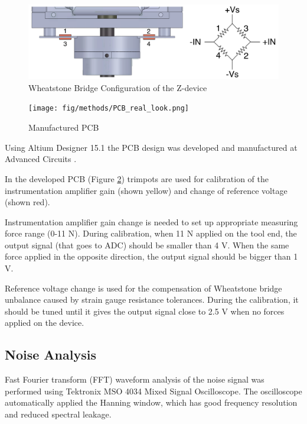 \begin{figure}[h]
	\begin{center}
		\includegraphics[width=140mm]{fig/methods/Wiring_z.pdf}
	\end{center}
	\vspace{-4mm}
	\caption[Wheatstone Bridge Configuration of the Z-device]
	{Wheatstone Bridge Configuration of the Z-device}
	\label{fig:WB_z}
	\vspace{-2mm}
\end{figure}
	
\begin{figure}[h]
	\begin{center}
		\texttt{[image: fig/methods/PCB\_real\_look.png]}
	\end{center}
	\vspace{-4mm}
	\caption[Manufactured PCB]
	{Manufactured PCB}
	\label{fig:PCB_real}
	\vspace{-2mm}
\end{figure}
	
Using Altium Designer 15.1 the PCB design was developed and manufactured at Advanced Circuits \cite{PCB_manufacturer}. 

In the developed PCB (Figure \ref{fig:PCB_real}) trimpots are used for calibration of the instrumentation amplifier gain (shown yellow) and change of reference voltage (shown red).

Instrumentation amplifier gain change is needed to set up appropriate measuring force range (0-11 N). During calibration, when 11 N applied on the tool end, the output signal (that goes to ADC) should be smaller than 4 V. When the same force applied in the opposite direction, the output signal should be bigger than 1 V.
 
Reference voltage change is used for the compensation of Wheatstone bridge unbalance caused by strain gauge resistance tolerances. During the calibration, it should be tuned until it gives the output signal close to 2.5 V when no forces applied on the device.


	\subsection{Noise Analysis}
	\label{sec:NoiseExp}
	Fast Fourier transform (FFT) waveform analysis of the noise signal was performed using Tektronix MSO 4034 Mixed Signal Oscilloscope. The oscilloscope automatically applied the Hanning window, which has good frequency resolution and reduced spectral leakage\cite{harris_use_1978}.
	
